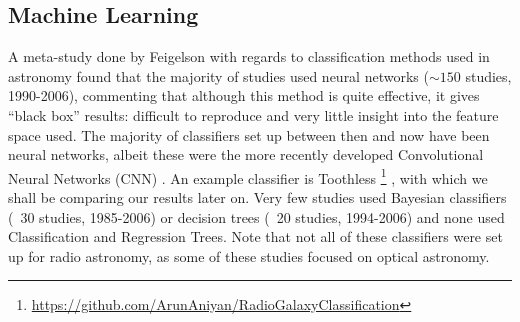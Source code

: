 \documentclass[conference]{IEEEtran}
\begin{document}

\subsection{Machine Learning}
A meta-study done by Feigelson \cite{feigelson} with regards to classification 
methods used in astronomy found that the majority of studies used neural networks
($\sim150$ studies, 1990-2006), commenting that although this method is quite effective, 
it gives ``black box'' results: difficult to reproduce and very little insight into 
the feature space used. The majority of classifiers set up between then and now 
have been neural networks, albeit these were the more recently developed 
Convolutional Neural Networks (CNN) \cite{hinton_2012}. An example classifier is Toothless \footnote{\url{https://github.com/ArunAniyan/RadioGalaxyClassification}}  \cite{aniyan_thorat_2017}, with which we shall be comparing our results later on. Very few studies used 
Bayesian classifiers (~30 studies, 1985-2006) or decision trees (~20 studies, 
1994-2006) and none used Classification and Regression Trees. Note that not all of these classifiers were set up for radio astronomy, as some of these studies focused on optical astronomy.
\end{document}
